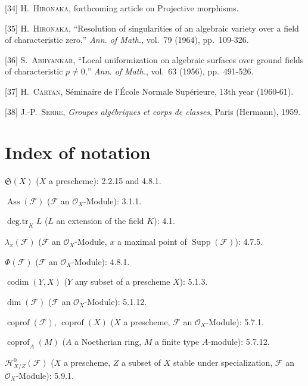 [34] H.~\textsc{Hironaka}, forthcoming article on Projective
morphisms.

[35] H.~\textsc{Hironaka}, ``Resolution of singularities of an
algebraic variety over a field of characteristic zero,'' \emph{Ann. of Math.},
vol.~79 (1964), pp.~109-326.

[36] S.~\textsc{Abhyankar}, ``Local uniformization on algebraic
surfaces over ground fields of characteristic $p\ne0$,'' \emph{Ann. of
Math.}, vol.~63 (1956), pp.~491-526.

[37] H.~\textsc{Cartan}, Séminaire de l'École Normale
Supérieure, 13th year (1960-61).

[38] J.-P.~\textsc{Serre}, \emph{Groupes algébriques et corps de
classes}, Paris (Hermann), 1959.

\endgroup

\clearpage
{}
{}
\section*{Index of notation}

\begingroup
\small
\setlength{\parindent}{0pt}
\setlength{\parskip}{2pt}

$\mathfrak S(X)$ ($X$ a prescheme): 2.2.15 and 4.8.1.

$\operatorname{Ass}(\mathscr F)$ ($\mathscr F$ an $\mathcal O_X$-Module): 3.1.1.

$\operatorname{deg.tr}_K L$ ($L$ an extension of the field $K$): 4.1.

$\lambda_x(\mathscr F)$ ($\mathscr F$ an $\mathcal O_X$-Module, $x$ a maximal
point of $\operatorname{Supp}(\mathscr F)$): 4.7.5.

$\Phi(\mathscr F)$ ($\mathscr F$ an $\mathcal O_X$-Module): 4.8.1.

$\operatorname{codim}(Y,X)$ ($Y$ any subset of a prescheme $X$): 5.1.3.

$\dim(\mathscr F)$ ($\mathscr F$ an $\mathcal O_X$-Module): 5.1.12.

$\operatorname{coprof}(\mathscr F)$, $\operatorname{coprof}(X)$ ($X$ a
prescheme, $\mathscr F$ an $\mathcal O_X$-Module): 5.7.1.

$\operatorname{coprof}_A(M)$ ($A$ a Noetherian ring, $M$ a finite type
$A$-module): 5.7.12.

$\mathcal H^0_{X/Z}(\mathscr F)$ ($X$ a prescheme, $Z$ a subset of $X$ stable
under specialization, $\mathscr F$ an $\mathcal O_X$-Module): 5.9.1.

